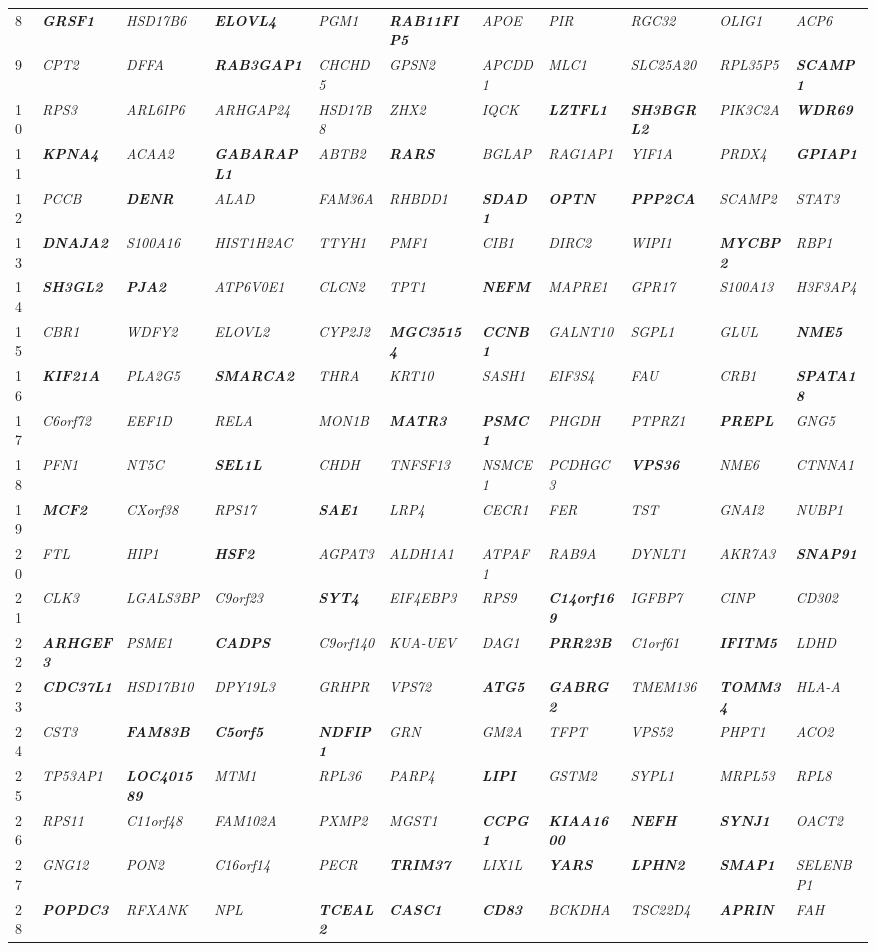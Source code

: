 \documentclass[letterpaper,12pt]{article}
\numberwithin{equation}{appendix}
\begin{document}
\begin{landscape}
{{\begin{longtable}{l >{\itshape}l >{\itshape}l >{\itshape}l >{\itshape}l >{\itshape}l >{\itshape}l >{\itshape}l >{\itshape}l >{\itshape}l >{\itshape}l}
8&{\bfseries {GRSF1}}&HSD17B6&{\bfseries {ELOVL4}}&PGM1&{\bfseries {RAB11FIP5}}&APOE&PIR&RGC32&OLIG1&ACP6\tabularnewline
9&CPT2&DFFA&{\bfseries {RAB3GAP1}}&CHCHD5&GPSN2&APCDD1&MLC1&SLC25A20&RPL35P5&{\bfseries {SCAMP1}}\tabularnewline
10&RPS3&ARL6IP6&ARHGAP24&HSD17B8&ZHX2&IQCK&{\bfseries {LZTFL1}}&{\bfseries {SH3BGRL2}}&PIK3C2A&{\bfseries {WDR69}}\tabularnewline
11&{\bfseries {KPNA4}}&ACAA2&{\bfseries {GABARAPL1}}&ABTB2&{\bfseries {RARS}}&BGLAP&RAG1AP1&YIF1A&PRDX4&{\bfseries {GPIAP1}}\tabularnewline
12&PCCB&{\bfseries {DENR}}&ALAD&FAM36A&RHBDD1&{\bfseries {SDAD1}}&{\bfseries {OPTN}}&{\bfseries {PPP2CA}}&SCAMP2&STAT3\tabularnewline
13&{\bfseries {DNAJA2}}&S100A16&HIST1H2AC&TTYH1&PMF1&CIB1&DIRC2&WIPI1&{\bfseries {MYCBP2}}&RBP1\tabularnewline
14&{\bfseries {SH3GL2}}&{\bfseries {PJA2}}&ATP6V0E1&CLCN2&TPT1&{\bfseries {NEFM}}&MAPRE1&GPR17&S100A13&H3F3AP4\tabularnewline
15&CBR1&WDFY2&ELOVL2&CYP2J2&{\bfseries {MGC35154}}&{\bfseries {CCNB1}}&GALNT10&SGPL1&GLUL&{\bfseries {NME5}}\tabularnewline
16&{\bfseries {KIF21A}}&PLA2G5&{\bfseries {SMARCA2}}&THRA&KRT10&SASH1&EIF3S4&FAU&CRB1&{\bfseries {SPATA18}}\tabularnewline
17&C6orf72&EEF1D&RELA&MON1B&{\bfseries {MATR3}}&{\bfseries {PSMC1}}&PHGDH&PTPRZ1&{\bfseries {PREPL}}&GNG5\tabularnewline
18&PFN1&NT5C&{\bfseries {SEL1L}}&CHDH&TNFSF13&NSMCE1&PCDHGC3&{\bfseries {VPS36}}&NME6&CTNNA1\tabularnewline
19&{\bfseries {MCF2}}&CXorf38&RPS17&{\bfseries {SAE1}}&LRP4&CECR1&FER&TST&GNAI2&NUBP1\tabularnewline
20&FTL&HIP1&{\bfseries {HSF2}}&AGPAT3&ALDH1A1&ATPAF1&RAB9A&DYNLT1&AKR7A3&{\bfseries {SNAP91}}\tabularnewline
21&CLK3&LGALS3BP&C9orf23&{\bfseries {SYT4}}&EIF4EBP3&RPS9&{\bfseries {C14orf169}}&IGFBP7&CINP&CD302\tabularnewline
22&{\bfseries {ARHGEF3}}&PSME1&{\bfseries {CADPS}}&C9orf140&KUA-UEV&DAG1&{\bfseries {PRR23B}}&C1orf61&{\bfseries {IFITM5}}&LDHD\tabularnewline
23&{\bfseries {CDC37L1}}&HSD17B10&DPY19L3&GRHPR&VPS72&{\bfseries {ATG5}}&{\bfseries {GABRG2}}&TMEM136&{\bfseries {TOMM34}}&HLA-A\tabularnewline
24&CST3&{\bfseries {FAM83B}}&{\bfseries {C5orf5}}&{\bfseries {NDFIP1}}&GRN&GM2A&TFPT&VPS52&PHPT1&ACO2\tabularnewline
25&TP53AP1&{\bfseries {LOC401589}}&MTM1&RPL36&PARP4&{\bfseries {LIPI}}&GSTM2&SYPL1&MRPL53&RPL8\tabularnewline
26&RPS11&C11orf48&FAM102A&PXMP2&MGST1&{\bfseries {CCPG1}}&{\bfseries {KIAA1600}}&{\bfseries {NEFH}}&{\bfseries {SYNJ1}}&OACT2\tabularnewline
27&GNG12&PON2&C16orf14&PECR&{\bfseries {TRIM37}}&LIX1L&{\bfseries {YARS}}&{\bfseries {LPHN2}}&{\bfseries {SMAP1}}&SELENBP1\tabularnewline
28&{\bfseries {POPDC3}}&RFXANK&NPL&{\bfseries {TCEAL2}}&{\bfseries {CASC1}}&{\bfseries {CD83}}&BCKDHA&TSC22D4&{\bfseries {APRIN}}&FAH\tabularnewline

\end{longtable}}}
\end{landscape}
\end{document}

